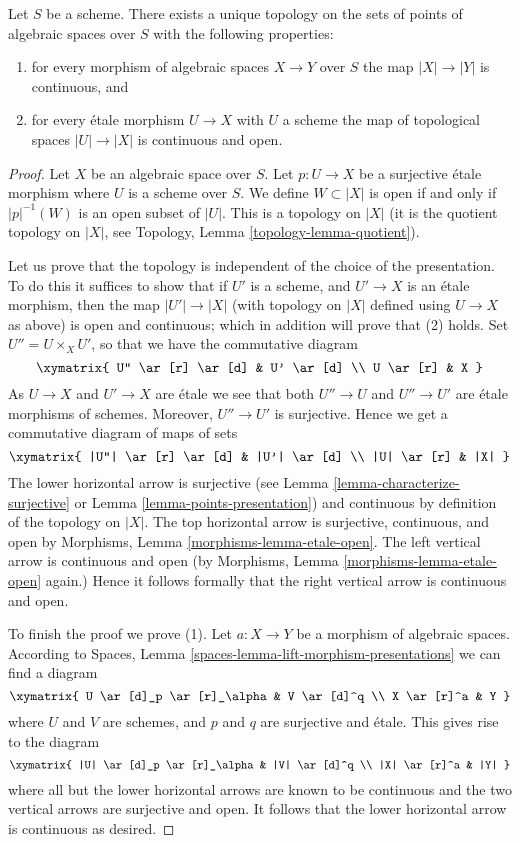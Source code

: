 \begin{lemma}
\label{lemma-topology-points}
Let $S$ be a scheme. There exists a unique topology on the sets of points
of algebraic spaces over $S$ with the following properties:
\begin{enumerate}
\item for every morphism of algebraic spaces $X \to Y$ over $S$
the map $|X| \to |Y|$ is continuous, and
\item for every \'etale morphism $U \to X$ with $U$ a scheme
the map of topological spaces $|U| \to |X|$ is continuous and open.
\end{enumerate}
\end{lemma}

\begin{proof}
Let $X$ be an algebraic space over $S$. Let $p : U \to X$ be a
surjective \'etale morphism where $U$ is a scheme over $S$.
We define $W \subset |X|$ is open if and only if $|p|^{-1}(W)$
is an open subset of $|U|$. This is a topology on $|X|$
(it is the quotient topology on $|X|$, see
Topology, Lemma \ref{topology-lemma-quotient}).

\medskip\noindent
Let us prove that the topology is independent of the choice of
the presentation. To do this it suffices to show that if $U'$ is a scheme,
and $U' \to X$ is an \'etale morphism, then the map $|U'| \to |X|$
(with topology on $|X|$ defined using $U \to X$ as above)
is open and continuous; which in addition will prove that (2) holds.
Set $U'' = U \times_X U'$, so that we have the commutative diagram
$$
\xymatrix{
U'' \ar[r] \ar[d] & U' \ar[d] \\
U \ar[r] & X
}
$$
As $U \to X$ and $U' \to X$ are \'etale we see that
both $U'' \to U$ and $U'' \to U'$ are \'etale morphisms of schemes.
Moreover, $U'' \to U'$ is surjective. Hence
we get a commutative diagram of maps of sets
$$
\xymatrix{
|U''| \ar[r] \ar[d] & |U'| \ar[d] \\
|U| \ar[r] & |X|
}
$$
The lower horizontal arrow is surjective (see
Lemma \ref{lemma-characterize-surjective}
or
Lemma \ref{lemma-points-presentation})
and continuous by definition of the topology on $|X|$.
The top horizontal arrow is surjective, continuous, and open by
Morphisms, Lemma \ref{morphisms-lemma-etale-open}.
The left vertical arrow is continuous and open (by
Morphisms, Lemma \ref{morphisms-lemma-etale-open}
again.) Hence it follows formally that the right vertical
arrow is continuous and open.

\medskip\noindent
To finish the proof we prove (1).
Let $a : X \to Y$ be a morphism of algebraic spaces. According to
Spaces, Lemma \ref{spaces-lemma-lift-morphism-presentations}
we can find a diagram
$$
\xymatrix{
U \ar[d]_p \ar[r]_\alpha & V \ar[d]^q \\
X \ar[r]^a & Y
}
$$
where $U$ and $V$ are schemes, and $p$ and $q$ are surjective and \'etale.
This gives rise to the diagram
$$
\xymatrix{
|U| \ar[d]_p \ar[r]_\alpha & |V| \ar[d]^q \\
|X| \ar[r]^a & |Y|
}
$$
where all but the lower horizontal arrows are known to be continuous and
the two vertical arrows are surjective and open. It follows that the
lower horizontal arrow is continuous as desired.
\end{proof}


